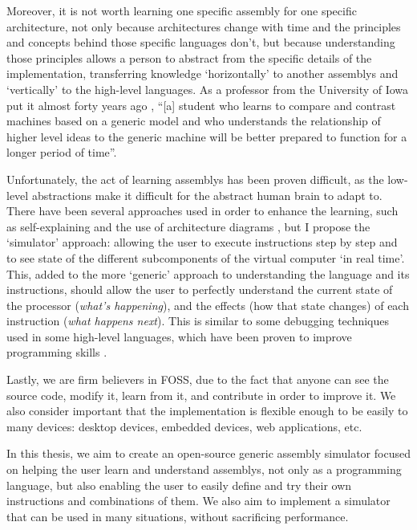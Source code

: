 Moreover, it is not worth learning one specific \gls{assembly} for one specific architecture, not only because architectures change with time and the principles and concepts behind those specific languages don't, but because understanding those principles allows a person to abstract from the specific details of the implementation, transferring knowledge `horizontally' to another \glspl{assembly} and `vertically' to the \glspl{high-level language}. As a professor from the University of Iowa put it almost forty years ago \parencite{DeckerWilliamF.1985Amat}, ``[a] student who learns to compare and contrast machines based on a generic model and who understands the relationship of higher level ideas to the generic machine will be better prepared to function for a longer period of time''.

Unfortunately, the act of learning \glspl{assembly} has been proven difficult, as the low-level abstractions make it difficult for the abstract human brain to adapt to. There have been several approaches used in order to enhance the learning, such as self-explaining and the use of architecture diagrams  \parencite{HungY.-C2012CSWC}, but I propose the `simulator' approach: allowing the user to execute instructions step by step and to see state of the different subcomponents of the virtual \gls{computer} `in real time'. This, added to the more `generic' approach to understanding the language and its instructions, should allow the user to perfectly understand the current state of the processor (\textit{what's happening}), and the effects (how that state changes) of each instruction (\textit{what happens next}). This is similar to some \gls{debugging} techniques used in some \glspl{high-level language}, which have been proven to improve programming skills \parencite{KLAHR1988362}.

Lastly, we are firm believers in \gls{FOSS}, due to the fact that anyone can see the source code, modify it, learn from it, and contribute in order to improve it. We also consider important that the implementation is flexible enough to be easily  to many devices: \glspl{desktop device}, \glspl{embedded device}, \glspl{web application}, etc.

In this thesis, we aim to create an open-source generic \gls{assembly} simulator focused on helping the user learn and understand \glspl{assembly}, not only as a \gls{programming language}, but also enabling the user to easily define and try their own instructions and combinations of them. We also aim to implement a simulator that can be used in many situations, without sacrificing performance.



